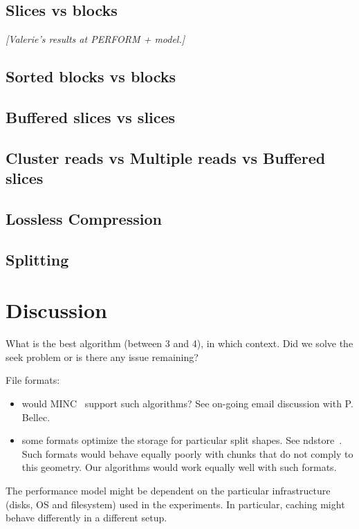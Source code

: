 \documentclass[10pt, conference, compsocconf]{IEEEtran}
\newcommand{\todo}[1]{
  \color{red}\emph{[#1]}
  \color{black}
}
\begin{document}
\subsection{Slices vs blocks}

\todo{Valerie's results at PERFORM + model.}

\subsection{Sorted blocks vs blocks}

\subsection{Buffered slices vs slices}


\subsection{Cluster reads vs Multiple reads vs Buffered slices}


\subsection{Lossless Compression}

\subsection{Splitting}


\section{Discussion}
\label{sec:discussion}

What is the best algorithm (between 3 and 4), in which context. Did we
solve the seek problem or is there any issue remaining?

File formats:
\begin{itemize}
\item would MINC~\cite{vincent2016minc} support such algorithms? See on-going email discussion
with P. Bellec.
\item some formats optimize the storage for particular split shapes. See
  ndstore~\cite{burns2013open}. Such formats would behave equally
  poorly with chunks that do not comply to this geometry. Our
  algorithms would work equally well with such formats.
\end{itemize}

The performance model might be dependent on the particular
infrastructure (disks, OS and filesystem) used in the experiments. In
particular, caching might behave differently in a different setup.
\end{document}
